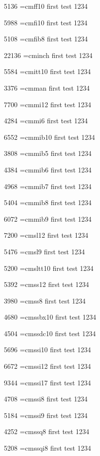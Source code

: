 5136	\tstfont \font\tstfont=cmff10 first test 1234 

5988	\tstfont \font\tstfont=cmfi10 first test 1234 

5108	\tstfont \font\tstfont=cmfib8 first test 1234 

22136	\tstfont \font\tstfont=cminch first test 1234 

5584	\tstfont \font\tstfont=cmitt10 first test 1234 

3376	\tstfont \font\tstfont=cmman first test 1234 

7700	\tstfont \font\tstfont=cmmi12 first test 1234 

4284	\tstfont \font\tstfont=cmmi6 first test 1234 

6552	\tstfont \font\tstfont=cmmib10 first test 1234 

3808	\tstfont \font\tstfont=cmmib5 first test 1234 

4384	\tstfont \font\tstfont=cmmib6 first test 1234 

4968	\tstfont \font\tstfont=cmmib7 first test 1234 

5404	\tstfont \font\tstfont=cmmib8 first test 1234 

6072	\tstfont \font\tstfont=cmmib9 first test 1234 

7200	\tstfont \font\tstfont=cmsl12 first test 1234 

5476	\tstfont \font\tstfont=cmsl9 first test 1234 

5200	\tstfont \font\tstfont=cmsltt10 first test 1234 

5392	\tstfont \font\tstfont=cmss12 first test 1234 

3980	\tstfont \font\tstfont=cmss8 first test 1234 

4680	\tstfont \font\tstfont=cmssbx10 first test 1234 

4504	\tstfont \font\tstfont=cmssdc10 first test 1234 

5696	\tstfont \font\tstfont=cmssi10 first test 1234 

6672	\tstfont \font\tstfont=cmssi12 first test 1234 

9344	\tstfont \font\tstfont=cmssi17 first test 1234 

4708	\tstfont \font\tstfont=cmssi8 first test 1234 

5184	\tstfont \font\tstfont=cmssi9 first test 1234 

4252	\tstfont \font\tstfont=cmssq8 first test 1234 

5208	\tstfont \font\tstfont=cmssqi8 first test 1234 

